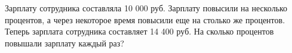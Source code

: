 Зарплату сотрудника составляла 10 000 руб. Зарплату повысили на несколько процентов, а через некоторое время повысили еще на столько же процентов. Теперь зарплата сотрудника составляет 14 400 руб. На сколько процентов повышали зарплату каждый раз?